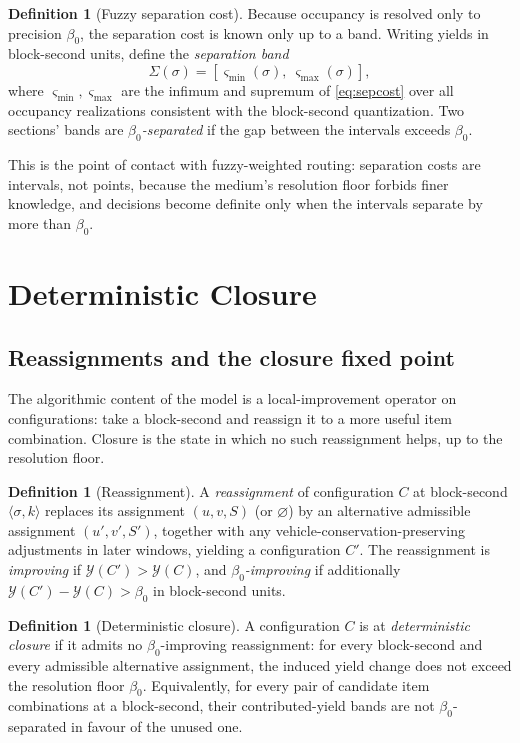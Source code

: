 \documentclass[11pt,twocolumn,a4paper]{article}
\theoremstyle{definition}
\newtheorem{definition}[theorem]{Definition}
\theoremstyle{remark}
\newcommand{\yield}{\mathcal{Y}}
\newcommand{\blocktime}{\beta_0}
\newcommand{\sep}{\varsigma}
\begin{document}
\begin{definition}[Fuzzy separation cost]
\label{def:fuzzysep}
Because occupancy is resolved only to precision $\blocktime$, the separation cost is known only up to a band. Writing yields in block-second units, define the \emph{separation band}
\begin{equation}
\Sigma(\sigma) = [\sep_{\min}(\sigma),\ \sep_{\max}(\sigma)],
\end{equation}
where $\sep_{\min},\sep_{\max}$ are the infimum and supremum of \eqref{eq:sepcost} over all occupancy realizations consistent with the block-second quantization. Two sections' bands are \emph{$\blocktime$-separated} if the gap between the intervals exceeds $\blocktime$.
\end{definition}

This is the point of contact with fuzzy-weighted routing: separation costs are intervals, not points, because the medium's resolution floor forbids finer knowledge, and decisions become definite only when the intervals separate by more than $\blocktime$.

\section{Deterministic Closure}
\label{sec:closure}

\subsection{Reassignments and the closure fixed point}

The algorithmic content of the model is a local-improvement operator on configurations: take a block-second and reassign it to a more useful item combination. Closure is the state in which no such reassignment helps, up to the resolution floor.

\begin{definition}[Reassignment]
\label{def:reassign}
A \emph{reassignment} of configuration $C$ at block-second $\langle\sigma,k\rangle$ replaces its assignment $(u,v,S)$ (or $\varnothing$) by an alternative admissible assignment $(u',v',S')$, together with any vehicle-conservation-preserving adjustments in later windows, yielding a configuration $C'$. The reassignment is \emph{improving} if $\yield(C') > \yield(C)$, and \emph{$\blocktime$-improving} if additionally $\yield(C') - \yield(C) > \blocktime$ in block-second units.
\end{definition}

\begin{definition}[Deterministic closure]
\label{def:closure}
A configuration $C$ is at \emph{deterministic closure} if it admits no $\blocktime$-improving reassignment: for every block-second and every admissible alternative assignment, the induced yield change does not exceed the resolution floor $\blocktime$. Equivalently, for every pair of candidate item combinations at a block-second, their contributed-yield bands are not $\blocktime$-separated in favour of the unused one.
\end{definition}
\end{document}
